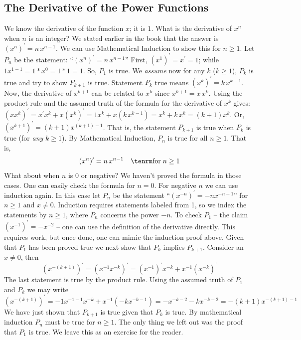 \subsection{The Derivative of the Power Functions}
We know the derivative of the function $x$; it is $1$. 
What is the derivative of $x^n$ when $n$ is an integer? We stated earlier in the book 
that the answer is $(x^n)^\prime = n\, x^{n-1}$. We can use Mathematical 
Induction to show this for $n\ge1$. Let $P_n$ be the statement: 
``$(x^n)^\prime = n \, x^{n-1}$'' First, 
$(x^1)^\prime = x^\prime = 1$; while $1 x^{1-1} = 1 * x^0 = 1 * 1 = 1$. 
So, $P_1$ is true.
We {\it assume\/} now for any $k$ ($k\ge1$), $P_k$ is true and try to show $P_{k+1}$ is true.
Statement $P_k$ true means $(x^k)^\prime = k \, x^{k-1}$. Now, 
the derivative of $x^{k+1}$ can be related to $x^k$ since
$x^{k+1} = x \, x^k$. Using the product rule and the assumed truth of the formula for the derivative 
of $x^k$ gives:
$(x x^k)^\prime = x^\prime x^k + x (x^k)^\prime = 1 x^k + x (k\, x^{k-1}) 
= x^k + k\,x^k = (k+1)x^k$. Or, $(x^{k+1})^\prime = (k+1)x^{(k+1)-1}$. 
That is, the statement $P_{k+1}$ 
is true when $P_k$ is true (for {\it any\/} $k\ge 1$). By Mathematical Induction, $P_n$ is true 
for all $n\ge 1$. That is,
$$
(x^n)^\prime = n\, x^{n-1} \quad {\rm for} \; n\ge 1
$$
What about when $n$ is $0$ or negative? We haven't proved the formula in those cases. One can easily check the formula for
$n=0$. For negative $n$ we can use induction again. In this case let $P_n$ be the statement ``$(x^{-n})^\prime = -n x^{-n-1}$'' for
$n \ge 1$ and $x\ne0$. Induction requires statements labeled from 1, so we index the statements by $n \ge 1$, where $P_n$ concerns the power $-n$.
To check $P_1$ -- the claim $(x^{-1})^\prime = -x^{-2}$ -- one can use the definition of the derivative directly.
This requires work, but once done, one can mimic the induction proof above. Given that $P_1$ has been proved true we next show
that $P_k$ implies $P_{k+1}$. Consider an $x \ne 0$, then 
$$
(x^{-(k+1)})^\prime = (x^{-1} x^{-k})^\prime = (x^{-1})^\prime x^{-k}
+ x^{-1} (x^{-k})^\prime
$$ 
The last statement is true by the product rule. Using the assumed truth of $P_1$ and $P_k$ we may write
$$
(x^{-(k+1)})^\prime = -1x^{-1-1} x^{-k}
+ x^{-1} (-kx^{-k-1}) = -x^{-k-2} - kx^{-k-2} = -(k+1) x^{-(k+1) - 1}
$$
We have just shown that $P_{k+1}$ is true given that $P_k$ is true. By mathematical induction $P_n$ must be true for $n\ge 1$.
The only thing we left out was the proof that $P_1$ is true. We leave this as an exercise for the reader.


